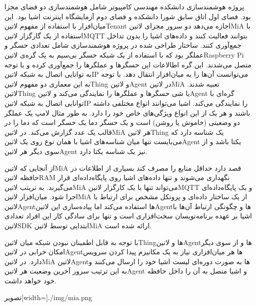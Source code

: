 \documentclass[]{assignment}
\begin{document}
پروژه هوشمند‌سازی دانشکده مهندسی کامپیوتر شامل هوشمند‌سازی دو فضای مجزا بود. فضای اول اتاق سابق شورا دانشکده و فضای دوم آزمایشگاه اینترنت اشیا بود.
این میان‌افزار با استفاده از مفهوم ‌لاتین{Tenant} اجازه می‌دهد دو سرور مجزای ‌لاتین{MiA} با استفاده از یک گارگزار ‌لاتین{MQTT}
بتوانند فعالیت کنند و داده‌های اشیا را بدون تداخل جمع‌آوری کنند.
ساختار طراحی شده در پروژه هوشمند‌سازی شامل تعدادی حسگر و عملگر بود که با استفاده از یک شبکه حسگر بی‌سیم به یک گره‌ی ‌لاتین{Raspberry Pi}
متصل می‌شدند. این گره اطالاعات این حسگرها و عملگرها را جمع‌آوری کرده و با توجه به توانایی اتصال به شبکه ‌لاتین{IP} می‌توانست آن‌ها را به میان‌افزار انتقال دهد.
با توجه به این معماری دو مفهوم ‌لاتین{Thing} و ‌لاتین{Agent} در ‌لاتین{MiA} تعبیه شدند. ‌لاتین{Thing} یا شی حسگرها و عملگرها را نمایندگی می‌کند
و ‌لاتین{Agent} گره‌ای با توانایی اتصال به شبکه ‌لاتین{IP} را نمایندگی می‌کند.
اشیا می‌توانند انواع مختلفی داشته باشند و هر یک از این انواع ویژگی‌های خاص خود را دارد. به طور مثال لامپ یک عملگر دو وضعیتی (خاموش یا روشن)
است و یک حسگر دما یک حسگر است که دما را در قالب یک عدد گزارش می‌کند.
در ‌لاتین{MiA} هر ‌لاتین{Thing} یک شناسه دارد که می‌بایست تنها میان شناسه‌های اشیا با همان نوع روی یک ‌لاتین{Agent} یکتا باشد و از سوی دیگر هر ‌لاتین{Agent} نیز یک شناسه
یکتا دارد.

از آنجایی که ‌لاتین{MiA} قصد دارد حداقل منابع را مصرف کند بسیاری از اطلاعات در حافظه ‌لاتین{RAM} نگهداری می‌شوند و تنها داده‌های اشیا روی پایگاه‌داده‌ای قرار می‌گیرند.
به تریتب ‌لاتین{MiA} می‌تواند تنها با یک کارگزار ‌لاتین{MQTT} و یک پایگاه‌داده‌ای اجرا شود.
میان‌افزار ‌لاتین{MiA} از یک ساختار داده‌ای و پروتکل مشخص برای ارتباط با ‌لاتین{Agent}ها استفاده می‌کند اما پیاده‌سازی این ‌لاتین{Agent}ها و چگونگی ارتباط آن‌ها با
اشیا بر عهده برنامه‌نویسان سخت‌افزاری است و تنها برای سادگی کار این افراد تعدادی ‌لاتین{SDK} ابتدایی توسط ‌لاتین{MiA} ارائه شده است.

با توجه به قابل اطمینان نبودن شبکه میان ‌لاتین{Thing}ها و ‌لاتین{Agent}ها و از سوی دیگر امکان خرابی در ‌لاتین{Agent}ها هر میان‌افزاری نیاز به یک مکانیزم پیدا کردن سرویس
دارد. در ‌لاتین{MiA} ‌لاتین{Agent}ها به صورت دوره‌ای لیست اشیا خود را ارسال می‌کنند و به این ترتیب سرور آخرین وضعیت هر ‌لاتین{Agent} و اشیا متصل به آن را داخل حافظه خود خواهد داشت.

‌تصویر[width=\textwidth]{./img/mia.png}
\end{document}
